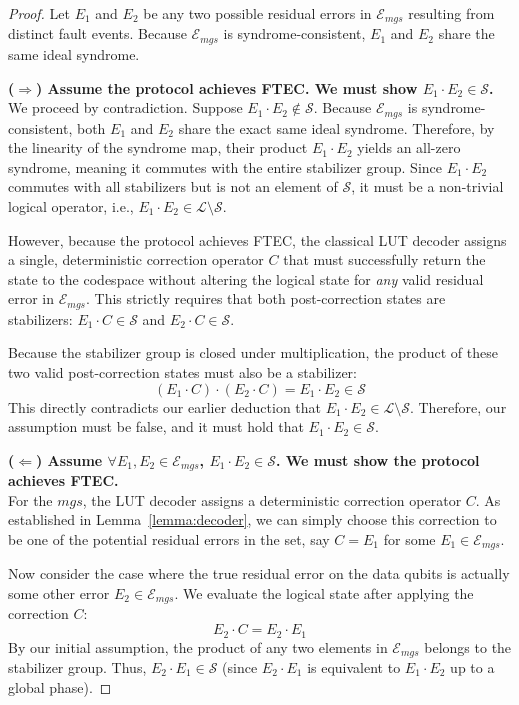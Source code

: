 \documentclass[acmsmallw,review]{acmart}
\begin{document}
\begin{proof}
Let $E_1$ and $E_2$ be any two possible residual errors in $\mathcal{E}_{mgs}$ resulting from distinct fault events. Because $\mathcal{E}_{mgs}$ is syndrome-consistent, $E_1$ and $E_2$ share the same ideal syndrome.

\textbf{($\Rightarrow$) Assume the protocol achieves FTEC. We must show $E_1 \cdot E_2 \in \mathcal{S}$.}\\
We proceed by contradiction. Suppose $E_1 \cdot E_2 \notin \mathcal{S}$. 
Because $\mathcal{E}_{mgs}$ is syndrome-consistent, both $E_1$ and $E_2$ share the exact same ideal syndrome. Therefore, by the linearity of the syndrome map, their product $E_1 \cdot E_2$ yields an all-zero syndrome, meaning it commutes with the entire stabilizer group. Since $E_1 \cdot E_2$ commutes with all stabilizers but is not an element of $\mathcal{S}$, it must be a non-trivial logical operator, i.e., $E_1 \cdot E_2 \in \mathcal{L} \setminus \mathcal{S}$.

However, because the protocol achieves FTEC, the classical LUT decoder assigns a single, deterministic correction operator $C$ that must successfully return the state to the codespace without altering the logical state for \emph{any} valid residual error in $\mathcal{E}_{mgs}$. This strictly requires that both post-correction states are stabilizers: $E_1 \cdot C \in \mathcal{S}$ and $E_2 \cdot C \in \mathcal{S}$. 

Because the stabilizer group is closed under multiplication, the product of these two valid post-correction states must also be a stabilizer:
$$(E_1 \cdot C) \cdot (E_2 \cdot C) = E_1 \cdot E_2 \in \mathcal{S}$$
This directly contradicts our earlier deduction that $E_1 \cdot E_2 \in \mathcal{L} \setminus \mathcal{S}$. Therefore, our assumption must be false, and it must hold that $E_1 \cdot E_2 \in \mathcal{S}$.

\textbf{($\Leftarrow$) Assume $\forall E_1, E_2 \in \mathcal{E}_{mgs}$, $E_1 \cdot E_2 \in \mathcal{S}$. We must show the protocol achieves FTEC.}\\
For the  $mgs$, the LUT decoder assigns a deterministic correction operator $C$. As established in Lemma~\ref{lemma:decoder}, we can simply choose this correction to be one of the potential residual errors in the set, say $C = E_1$ for some $E_1 \in \mathcal{E}_{mgs}$. 

Now consider the case where the true residual error on the data qubits is actually some other error $E_2 \in \mathcal{E}_{mgs}$. We evaluate the logical state after applying the correction $C$:
$$E_2 \cdot C = E_2 \cdot E_1$$
By our initial assumption, the product of any two elements in $\mathcal{E}_{mgs}$ belongs to the stabilizer group. Thus, $E_2 \cdot E_1 \in \mathcal{S}$ (since $E_2 \cdot E_1$ is equivalent to $E_1 \cdot E_2$ up to a global phase). 


\end{proof}
\end{document}
